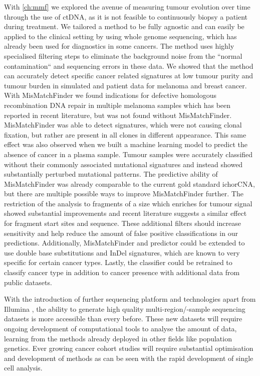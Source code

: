 With \autoref{ch:mmf} we explored the avenue of measuring tumour evolution over time through the use of ctDNA, as it is not feasible to  continuously biopsy a patient during treatment. We tailored a method to be fully agnostic and can easily be applied to the clinical setting by using whole genome sequencing, which has already been used for diagnostics in some cancers. The method uses highly specialised filtering steps to eliminate the background noise from the ``normal contamination`` and sequencing errors in these data. We showed that the method can accurately detect specific cancer related signatures at low tumour purity and tumour burden in simulated and patient data for melanoma and breast cancer. With MisMatchFinder we found indications for defective homologous recombination DNA repair in multiple melanoma samples which has been reported in recent literature, but was not found without MisMatchFinder. MisMatchFinder was able to detect signatures, which were not causing clonal fixation, but rather are present in all clones in different appearance. This same effect was also observed when we built a machine learning model to predict the absence of cancer in a plasma sample. Tumour samples were accurately classified without their commonly associated mutational signatures and instead showed substantially perturbed mutational patterns. The predictive ability of MisMatchFinder was already comparable to the current gold standard ichorCNA, but there are multiple possible ways to improve MisMatchFinder further. The restriction of the analysis to fragments of a size which enriches for tumour signal showed substantial improvements and recent literature suggests a similar effect for fragment start sites and sequence. These additional filters should increase sensitivity and help reduce the amount of false positive classifications in our predictions. Additionally, MisMatchFinder and predictor could be extended to use double base substitutions and InDel signatures, which are known to very specific for certain cancer types. Lastly, the classifier could be retrained to classify cancer type in addition to cancer presence with additional data from public datasets.

With the introduction of further sequencing platform and technologies apart from Illumina \cite{SingularGenomics2021,UltimaGenomics2022,ElementBiosciences2022}, the ability to generate high quality multi-region/-sample sequencing datasets is more accessible than every before. These new datasets will require ongoing development of computational tools to analyse the amount of data, learning from the methods already deployed in other fields like population genetics. Ever growing cancer cohort studies will require substantial optimisation and development of methods as can be seen with the rapid development of single cell analysis. 

